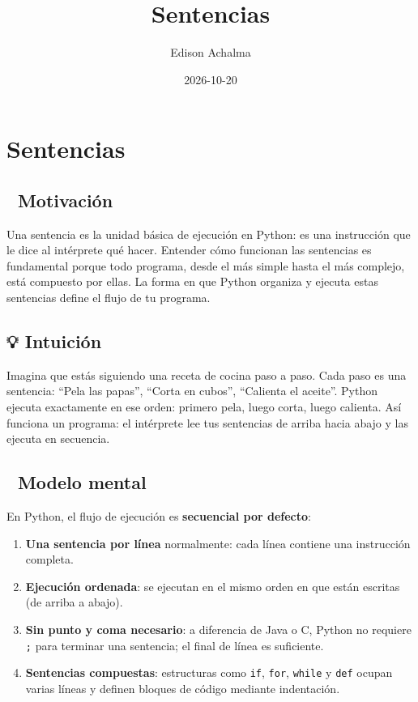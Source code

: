 \documentclass[
  doc,
  floatsintext,
  longtable,
  a4paper,
  nolmodern,
  notxfonts,
  notimes,
  12pt,
  colorlinks=true,linkcolor=blue,citecolor=blue,urlcolor=blue]{apa7}
\title{Sentencias}
\author{Edison Achalma}
\affiliation{
{Escuela Profesional de Economía, Universidad Nacional de San Cristóbal
de Huamanga}}
\date{2026-10-20}
\providecommand{\tightlist}{%
  \setlength{\itemsep}{0pt}\setlength{\parskip}{0pt}}
\begin{document}
\maketitle


\hypertarget{toc}{}
\tableofcontents
\newpage
\section[Introduction]{Sentencias}

\setcounter{secnumdepth}{3}

\setlength\LTleft{0pt}




\subsection{🎯 Motivación}\label{motivaciuxf3n}

Una sentencia es la unidad básica de ejecución en Python: es una
instrucción que le dice al intérprete qué hacer. Entender cómo funcionan
las sentencias es fundamental porque todo programa, desde el más simple
hasta el más complejo, está compuesto por ellas. La forma en que Python
organiza y ejecuta estas sentencias define el flujo de tu programa.

\subsection{💡 Intuición}\label{intuiciuxf3n}

Imagina que estás siguiendo una receta de cocina paso a paso. Cada paso
es una sentencia: ``Pela las papas'', ``Corta en cubos'', ``Calienta el
aceite''. Python ejecuta exactamente en ese orden: primero pela, luego
corta, luego calienta. Así funciona un programa: el intérprete lee tus
sentencias de arriba hacia abajo y las ejecuta en secuencia.

\subsection{🧠 Modelo mental}\label{modelo-mental}

En Python, el flujo de ejecución es \textbf{secuencial por defecto}:

\begin{enumerate}
\def\labelenumi{\arabic{enumi}.}
\tightlist
\item
  \textbf{Una sentencia por línea} normalmente: cada línea contiene una
  instrucción completa.
\item
  \textbf{Ejecución ordenada}: se ejecutan en el mismo orden en que
  están escritas (de arriba a abajo).
\item
  \textbf{Sin punto y coma necesario}: a diferencia de Java o C, Python
  no requiere \texttt{;} para terminar una sentencia; el final de línea
  es suficiente.
\item
  \textbf{Sentencias compuestas}: estructuras como \texttt{if},
  \texttt{for}, \texttt{while} y \texttt{def} ocupan varias líneas y
  definen bloques de código mediante indentación.
\end{enumerate}
\end{document}

